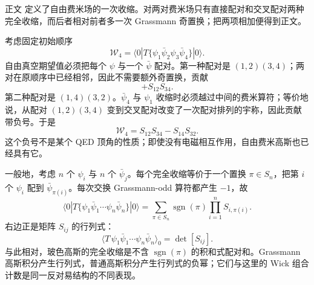 
\begin{derivation}

正文 定义了自由费米场的一次收缩。对两对费米场只有直接配对和交叉配对两种完全收缩，而后者相对前者多一次 Grassmann 奇置换；把两项相加便得到正文。



考虑固定初始顺序
\begin{equation*}
 \mathscr W_4
 =\langle0|T\{\psi_1\bar\psi_2\psi_3\bar\psi_4\}|0\rangle.
\end{equation*}
自由真空期望值必须把每个 $\psi$ 与一个 $\bar\psi$ 配对。第一种配对是 $(1,2)(3,4)$；两对在原顺序中已经相邻，因此不需要额外奇置换，贡献
\begin{equation*}
 +S_{12}S_{34}.
\end{equation*}
第二种配对是 $(1,4)(3,2)$。$\bar\psi_4$ 与 $\psi_1$ 收缩时必须越过中间的费米算符；等价地说，从配对 $(1,2)(3,4)$ 变到交叉配对改变了一次配对排列的宇称，因此贡献带负号。于是
\begin{equation*}
 {
 \mathscr W_4=S_{12}S_{34}-S_{14}S_{32}.}
 \end{equation*}
这个负号不是某个 QED 顶角的性质；即使没有电磁相互作用，自由费米高斯也已经具有它。

一般地，考虑 $n$ 个 $\psi_i$ 与 $n$ 个 $\bar\psi_j$。每个完全收缩等价于一个置换 $\pi\in S_n$，把第 $i$ 个 $\psi_i$ 配到 $\bar\psi_{\pi(i)}$。每次交换 Grassmann-odd 算符都产生 $-1$，故
\begin{equation*}
 \langle0|T\{\psi_1\bar\psi_1\cdots\psi_n\bar\psi_n\}|0\rangle
 =\sum_{\pi\in S_n}
 \operatorname{sgn}(\pi)
 \prod_{i=1}^{n}S_{i,\pi(i)}.
 \end{equation*}
右边正是矩阵 $S_{ij}$ 的行列式：
\begin{equation*}
 {
 \langle T\,\psi_1\bar\psi_1\cdots\psi_n\bar\psi_n\rangle_0
 =\det[S_{ij}].}
 \end{equation*}
与此相对，玻色高斯的完全收缩是不含 $\operatorname{sgn}(\pi)$ 的积和式配对和。Grassmann 高斯积分产生行列式，普通高斯积分产生行列式的负幂；它们与这里的 Wick 组合计数是同一反对易结构的不同表现。
\end{derivation}

